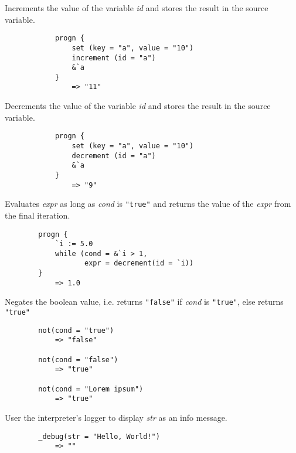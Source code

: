 \begin{multicols*}{2}
	Increments the value of the variable \textit{id} and stores the result in the source variable.
	\begin{verbatim}
			progn {
			    set (key = "a", value = "10")
			    increment (id = "a")
			    &`a
			}
			    => "11"
	\end{verbatim}
	Decrements the value of the variable \textit{id} and stores the result in the source variable.
	\begin{verbatim}
			progn {
			    set (key = "a", value = "10")
			    decrement (id = "a")
			    &`a
			}
			    => "9"
	\end{verbatim}
	Evaluates \textit{expr} as long as \textit{cond} is \verb|"true"| and returns the value of the \textit{expr}
	from the final iteration.
	\begin{verbatim}
		progn {
		    `i := 5.0
		    while (cond = &`i > 1,
		           expr = decrement(id = `i))
		}
		    => 1.0
	\end{verbatim}
	Negates the boolean value, i.e. returns \verb|"false"| if \textit{cond} is \verb|"true"|, else returns \verb|"true"|
	\begin{verbatim}
		not(cond = "true")
		    => "false"

		not(cond = "false")
		    => "true"

		not(cond = "Lorem ipsum")
		    => "true"
	\end{verbatim}
	User the interpreter's logger to display \textit{str} as an info message.
	\begin{verbatim}
		_debug(str = "Hello, World!")
		    => ""
	\end{verbatim}
\end{multicols*}
\newpage